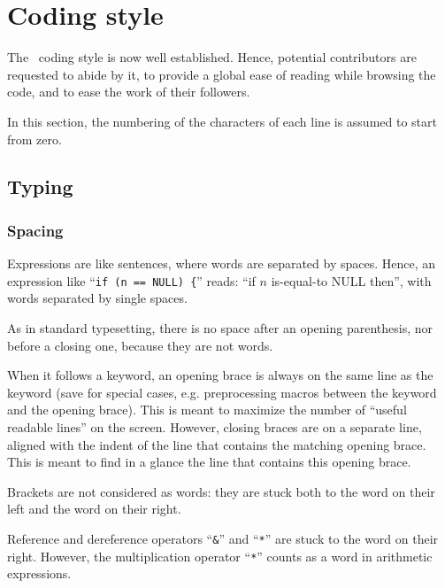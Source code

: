 
\section{Coding style}

The \scotch\ coding style is now well established. Hence, potential
contributors are requested to abide by it, to provide a global ease of
reading while browsing the code, and to ease the work of their
followers.

In this section, the numbering of the characters of each line is
assumed to start from zero.

\subsection{Typing}

\subsubsection{Spacing}

Expressions are like sentences, where words are separated by
spaces. Hence, an expression like ``\texttt{if~(n == NULL)~\{}''
reads: ``if $n$ is-equal-to NULL then'', with words separated by
single spaces.

As in standard typesetting, there is no space after an opening
parenthesis, nor before a closing one, because they are not words.

When it follows a keyword, an opening brace is always on the same line
as the keyword (save for special cases, e.g. preprocessing macros
between the keyword and the opening brace). This is meant to maximize
the number of ``useful readable lines'' on the screen. However,
closing braces are on a separate line, aligned with the indent of the
line that contains the matching opening brace. This is meant to find
in a glance the line that contains this opening brace.

Brackets are not considered as words: they are stuck both to the word
on their left and the word on their right.

Reference and dereference operators ``\texttt{\&}'' and ``\texttt{*}''
are stuck to the word on their right. However, the multiplication
operator ``\texttt{*}'' counts as a word in arithmetic expressions.


